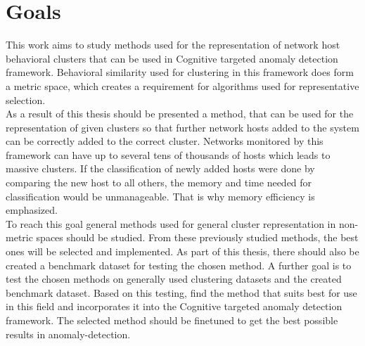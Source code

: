 \documentclass[thesis=B,english]{FITthesis}[2012/10/20]
\begin{document}
%

\chapter{Goals}

This work aims to study methods used for the representation of network host behavioral clusters that can be used in Cognitive targeted anomaly detection framework.
Behavioral similarity used for clustering in this framework does form a metric space, which creates a requirement for algorithms used for representative selection. \\

As a result of this thesis should be presented a method, that can be used for the representation of given clusters so that further network hosts added to the system can be correctly added to the correct cluster.
Networks monitored by this framework can have up to several tens of thousands of hosts which leads to massive clusters.
If the classification of newly added hosts were done by comparing the new host to all others, the memory and time needed for classification would be unmanageable.
That is why memory efficiency is emphasized. \\

To reach this goal general methods used for general cluster representation in non-metric spaces should be studied.
From these previously studied methods, the best ones will be selected and implemented.
As part of this thesis, there should also be created a benchmark dataset for testing the chosen method.
A further goal is to test the chosen methods on generally used clustering datasets and the created benchmark dataset.
Based on this testing, find the method that suits best for use in this field and incorporates it into the Cognitive targeted anomaly detection framework.
The selected method should be finetuned to get the best possible results in anomaly-detection.
\end{document}
